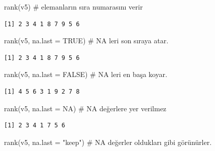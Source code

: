 \documentclass[
  letterpaper,
  DIV=11,
  numbers=noendperiod]{scrreprt}
\newenvironment{Shaded}{\begin{snugshade}}{\end{snugshade}}
\newcommand{\AttributeTok}[1]{\textcolor[rgb]{0.40,0.45,0.13}{#1}}
\newcommand{\CommentTok}[1]{\textcolor[rgb]{0.37,0.37,0.37}{#1}}
\newcommand{\ConstantTok}[1]{\textcolor[rgb]{0.56,0.35,0.01}{#1}}
\newcommand{\FunctionTok}[1]{\textcolor[rgb]{0.28,0.35,0.67}{#1}}
\newcommand{\NormalTok}[1]{\textcolor[rgb]{0.00,0.23,0.31}{#1}}
\newcommand{\StringTok}[1]{\textcolor[rgb]{0.13,0.47,0.30}{#1}}
\begin{document}
\begin{Shaded}
\begin{Highlighting}[]
\FunctionTok{rank}\NormalTok{(v5) }\CommentTok{\# elemanların sıra numarasını verir}
\end{Highlighting}
\end{Shaded}

\begin{verbatim}
[1] 2 3 4 1 8 7 9 5 6
\end{verbatim}

\begin{Shaded}
\begin{Highlighting}[]
\FunctionTok{rank}\NormalTok{(v5, }\AttributeTok{na.last =} \ConstantTok{TRUE}\NormalTok{) }\CommentTok{\# NA leri son sıraya atar.}
\end{Highlighting}
\end{Shaded}

\begin{verbatim}
[1] 2 3 4 1 8 7 9 5 6
\end{verbatim}

\begin{Shaded}
\begin{Highlighting}[]
\FunctionTok{rank}\NormalTok{(v5, }\AttributeTok{na.last =} \ConstantTok{FALSE}\NormalTok{) }\CommentTok{\# NA leri en başa koyar.}
\end{Highlighting}
\end{Shaded}

\begin{verbatim}
[1] 4 5 6 3 1 9 2 7 8
\end{verbatim}

\begin{Shaded}
\begin{Highlighting}[]
\FunctionTok{rank}\NormalTok{(v5, }\AttributeTok{na.last =} \ConstantTok{NA}\NormalTok{) }\CommentTok{\# NA değerlere yer verilmez}
\end{Highlighting}
\end{Shaded}

\begin{verbatim}
[1] 2 3 4 1 7 5 6
\end{verbatim}

\begin{Shaded}
\begin{Highlighting}[]
\FunctionTok{rank}\NormalTok{(v5, }\AttributeTok{na.last =} \StringTok{"keep"}\NormalTok{) }\CommentTok{\# NA değerler oldukları gibi görünürler.}
\end{Highlighting}
\end{Shaded}
\end{document}
